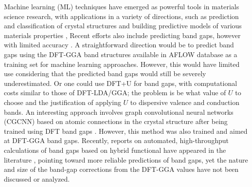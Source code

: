 \documentclass[%
reprint,
superscriptaddress,
citeautoscript,
 amsmath,amssymb,
 aps,
 prl,
floatfix,
]{revtex4-1}
\begin{document}
Machine learning (ML) techniques have emerged as powerful tools in materials science research, with applications in a variety of directions, such as prediction and classification of crystal structures \cite{Fischer2006,CARR2009339,Pilania2015,Yamashita2018,Ye2018}
and building predictive models of  various materials properties \cite{Pilania2013,Lee2016,Pilania2016,Bart2017}, 
Recent efforts also include predicting band gaps, however with limited accuracy \cite{Zhuo2018,Lu2018,Xie2018,Allam2018,Olsthoorn2019}. A straightforward direction would be to predict band gaps using the DFT-GGA band structures available in AFLOW database \cite{Curtarolo2012} as a training set for machine learning approaches. However, this would have limited use considering that the predicted band gaps would still be severely underestimated. Or one could use DFT+U \cite{Anisimov1997} for band gaps, with computational costs similar to those of DFT-LDA/GGA; the problem is be what value of $U$ to choose and the justification of applying $U$ to dispersive valence and conduction bands. An interesting approach involves graph convolutional neural networks (CGCNN) based on atomic connections in the crystal structure after being trained using DFT band gaps \cite{Xie2018}. However, this method was also trained and aimed at DFT-GGA band gaps. Recently, reports on automated, high-throughput calculations of band gaps based on hybrid functional have appeared in the literature \cite{Weng2019,Jie2019,Pilania2017,Ward2016,Huang2019}, pointing toward more reliable predictions of band gaps, yet the nature and size of the band-gap corrections from the DFT-GGA values have not been discussed or analyzed.
\end{document}
